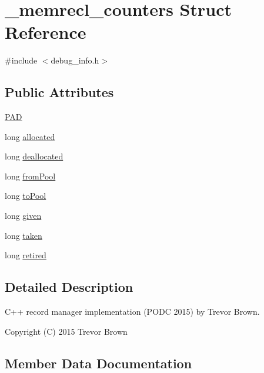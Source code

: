 \hypertarget{struct__memrecl__counters}{}\section{\+\_\+memrecl\+\_\+counters Struct Reference}
\label{struct__memrecl__counters}


{\ttfamily \#include $<$debug\+\_\+info.\+h$>$}

\subsection*{Public Attributes}
\begin{DoxyCompactItemize}
\item 
\hyperlink{struct__memrecl__counters_a9040f3bdf2bb6e94ca96cb97e10ebf06}{P\+AD}
\item 
long \hyperlink{struct__memrecl__counters_a43a8e1281a553076565a51adb10af4f3}{allocated}
\item 
long \hyperlink{struct__memrecl__counters_a3a282708c13a4bb3dca88d1de403020f}{deallocated}
\item 
long \hyperlink{struct__memrecl__counters_adff8f6b85fc8a0d3f5353254d5e45ab8}{from\+Pool}
\item 
long \hyperlink{struct__memrecl__counters_ab7cbb58dee671f9a8f658ed715226576}{to\+Pool}
\item 
long \hyperlink{struct__memrecl__counters_a187e306d4b1384707e79c4b8bbdc36fa}{given}
\item 
long \hyperlink{struct__memrecl__counters_ab1c31bc528693acd8ad1625c0c750743}{taken}
\item 
long \hyperlink{struct__memrecl__counters_aca54369ea9d56e14863e511b36a1f274}{retired}
\end{DoxyCompactItemize}


\subsection{Detailed Description}
C++ record manager implementation (P\+O\+DC 2015) by Trevor Brown.

Copyright (C) 2015 Trevor Brown 

\subsection{Member Data Documentation}
\mbox{\label{struct__memrecl__counters_a43a8e1281a553076565a51adb10af4f3}} 
